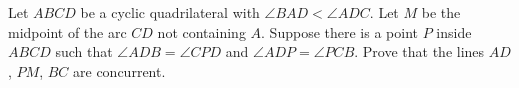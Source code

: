 Let $ABCD$ be a cyclic quadrilateral with $\angle BAD<\angle ADC$.
Let $M$ be the midpoint of the arc $CD$ not containing $A$.
Suppose there is a point $P$ inside $ABCD$ such that $\angle ADB=\angle CPD$ and $\angle ADP=\angle PCB$.
Prove that the lines $AD$, $PM$, $BC$ are concurrent.

